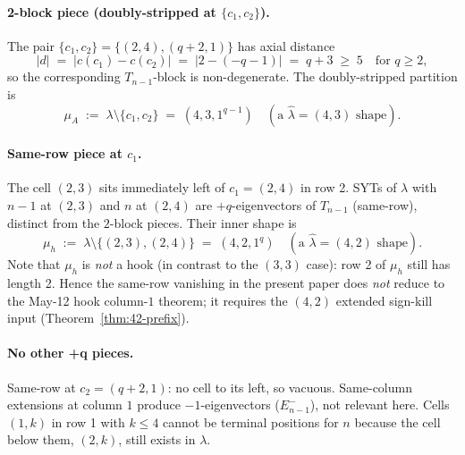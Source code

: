 \documentclass[11pt]{article}
\theoremstyle{definition}
\newcommand{\hatl}{\widehat\lambda}
\begin{document}
\paragraph{2-block piece (doubly-stripped at $\{c_1, c_2\}$).}
The pair $\{c_1, c_2\} = \{(2, 4), (q+2, 1)\}$ has axial distance
\[
   |d| \;=\; |c(c_1) - c(c_2)|
   \;=\; |2 - (-q-1)| \;=\; q + 3 \;\ge\; 5
   \quad \text{for } q \ge 2,
\]
so the corresponding $T_{n-1}$-block is non-degenerate.  The
doubly-stripped partition is
\[
   \mu_A \;:=\; \lambda \setminus \{c_1, c_2\} \;=\; (4, 3, 1^{q-1})
   \quad (\text{a $\hatl = (4, 3)$ shape}).
\]

\paragraph{Same-row piece at $c_1$.}
The cell $(2, 3)$ sits immediately left of $c_1 = (2, 4)$ in row 2.
SYTs of $\lambda$ with $n-1$ at $(2, 3)$ and $n$ at $(2, 4)$ are
$+q$-eigenvectors of $T_{n-1}$ (same-row), distinct from the
$2$-block pieces.  Their inner shape is
\[
   \mu_h \;:=\; \lambda \setminus \{(2, 3), (2, 4)\}
   \;=\; (4, 2, 1^q)
   \quad (\text{a $\hatl = (4, 2)$ shape}).
\]
Note that $\mu_h$ is \emph{not} a hook (in contrast to the $(3, 3)$
case): row 2 of $\mu_h$ still has length 2.  Hence the same-row
vanishing in the present paper does \emph{not} reduce to the May-12
hook column-$1$ theorem; it requires the $(4, 2)$ extended sign-kill
input (Theorem~\ref{thm:42-prefix}).

\paragraph{No other +q pieces.}
Same-row at $c_2 = (q+2, 1)$: no cell to its left, so vacuous.
Same-column extensions at column $1$ produce $-1$-eigenvectors
($E_{n-1}^-$), not relevant here.  Cells $(1, k)$ in row 1 with
$k \le 4$ cannot be terminal positions for $n$ because the cell
below them, $(2, k)$, still exists in $\lambda$.
\end{document}
